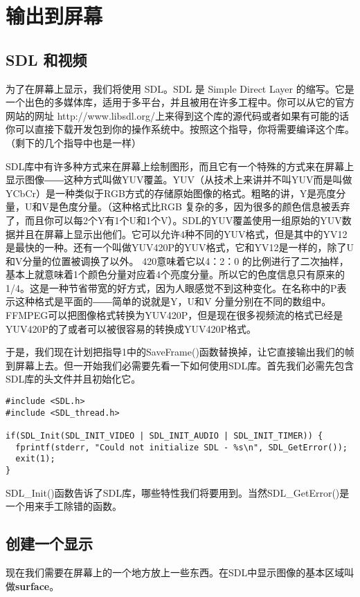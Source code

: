﻿\chapter{输出到屏幕}
\label{ch2}
\section{SDL 和视频}
为了在屏幕上显示，我们将使用 SDL。SDL 是 Simple Direct Layer 的缩写。它是一个出色的多媒体库，适用于多平台，并且被用在许多工程中。你可以从它的官方网站的网址 http://www.libsdl.org/上来得到这个库的源代码或者如果有可能的话你可以直接下载开发包到你的操作系统中。按照这个指导，你将需要编译这个库。（剩下的几个指导中也是一样）

SDL库中有许多种方式来在屏幕上绘制图形，而且它有一个特殊的方式来在屏幕上显示图像――这种方式叫做YUV覆盖。YUV（从技术上来讲并不叫YUV而是叫做YCbCr）是一种类似于RGB方式的存储原始图像的格式。粗略的讲，Y是亮度分量，U和V是色度分量。（这种格式比RGB 复杂的多，因为很多的颜色信息被丢弃了，而且你可以每2个Y有1个U和1个V）。SDL的YUV覆盖使用一组原始的YUV数据并且在屏幕上显示出他们。它可以允许4种不同的YUV格式，但是其中的YV12是最快的一种。还有一个叫做YUV420P的YUV格式，它和YV12是一样的，除了U和V分量的位置被调换了以外。 420意味着它以4：2：0 的比例进行了二次抽样，基本上就意味着1个颜色分量对应着4个亮度分量。所以它的色度信息只有原来的1/4。这是一种节省带宽的好方式，因为人眼感觉不到这种变化。在名称中的P表示这种格式是平面的――简单的说就是Y，U和V 分量分别在不同的数组中。FFMPEG可以把图像格式转换为YUV420P，但是现在很多视频流的格式已经是YUV420P的了或者可以被很容易的转换成YUV420P格式。

于是，我们现在计划把指导1中的SaveFrame()函数替换掉，让它直接输出我们的帧到屏幕上去。但一开始我们必需要先看一下如何使用SDL库。首先我们必需先包含SDL库的头文件并且初始化它。

\begin{lstlisting}
#include <SDL.h>
#include <SDL_thread.h>

if(SDL_Init(SDL_INIT_VIDEO | SDL_INIT_AUDIO | SDL_INIT_TIMER)) {
  fprintf(stderr, "Could not initialize SDL - %s\n", SDL_GetError());
  exit(1);
}
\end{lstlisting}

SDL_Init()函数告诉了SDL库，哪些特性我们将要用到。当然SDL_GetError()是一个用来手工除错的函数。

\section{创建一个显示}

现在我们需要在屏幕上的一个地方放上一些东西。在SDL中显示图像的基本区域叫做\textbf{surface}。

